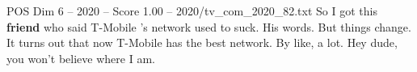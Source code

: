 \begin{textsample}{POS Dim 6 – 2020 – Score 1.00 – 2020/tv\_com\_2020\_82.txt}  \label{ex:f6_pos_047}
So I got this \textbf{friend} who said T-Mobile 's network used to suck.
His words.
But things change.
It turns out that now T-Mobile has the best network.
By like, a lot.
Hey dude, you won't believe where I am.

\end{textsample}
